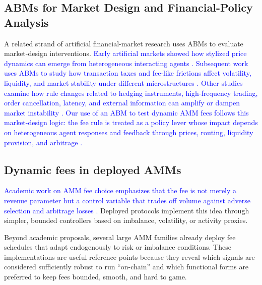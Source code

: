 \documentclass[11pt]{article}
\begin{document}
\subsection{ABMs for Market Design and Financial-Policy Analysis}
A related strand of artificial financial-market research uses ABMs to evaluate market-design interventions. \textcolor{blue}{Early artificial markets showed how stylized price dynamics can emerge from heterogeneous interacting agents \cite{raberto2001,chakraborti2011}.} \textcolor{blue}{Subsequent work uses ABMs to study how transaction taxes and fee-like frictions affect volatility, liquidity, and market stability under different microstructures \cite{westerhoff2006,mannaro2008,pellizzari2009}.} \textcolor{blue}{Other studies examine how rule changes related to hedging instruments, high-frequency trading, order cancellation, latency, and external information can amplify or dampen market instability \cite{brock2009,leal2016,carro2015,gao2024,yagi2020}.} \textcolor{blue}{Our use of an ABM to test dynamic AMM fees follows this market-design logic: the fee rule is treated as a policy lever whose impact depends on heterogeneous agent responses and feedback through prices, routing, liquidity provision, and arbitrage \cite{mizuta2020}.}


\subsection{Dynamic fees in deployed AMMs}
\label{subsec:deployed_dynamic_fees}

\textcolor{blue}{Academic work on AMM fee choice emphasizes that the fee is not merely a revenue parameter but a control variable that trades off volume against adverse selection and arbitrage losses \cite{milionis2023,cartea2023}.} Deployed protocols implement this idea through simpler, bounded controllers based on imbalance, volatility, or activity proxies.

Beyond academic proposals, several large AMM families already deploy fee schedules that adapt endogenously to risk or imbalance conditions. These implementations are useful reference points because they reveal which signals are considered sufficiently robust to run ``on-chain'' and which functional forms are preferred to keep fees bounded, smooth, and hard to game.
\end{document}
